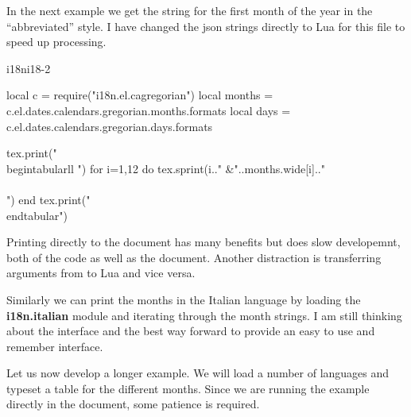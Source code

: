 In the next example we get the string for the first month of the year in the ``abbreviated'' style. I have changed the json
strings directly to Lua for this file to speed up processing.

\begin{texexample}{i18n}{i18-2}
\begin{luacode}
local c = require("i18n.el.cagregorian")
local months = c.el.dates.calendars.gregorian.months.formats
local days = c.el.dates.calendars.gregorian.days.formats

tex.print("\\begin{tabular}{ll} ")
for i=1,12 do
  tex.sprint(i.." &"..months.wide[i].."\\\\ ")
end
tex.print("\\end{tabular}")
\end{luacode}
\end{texexample}

Printing directly to the document has many benefits but does slow developemnt, both of the code as well as the document. Another distraction is transferring arguments from \tex to Lua and vice versa.

Similarly we can print the months in the Italian language by loading the \textbf{i18n.italian} module and iterating through the month strings. I am still thinking about the interface and the best way forward to provide an easy to use and remember interface. 


Let us now develop a longer example. We will load a number of languages and typeset a table for the different months.
Since we are running the example directly in the document, some patience is required. 

\bigskip 

